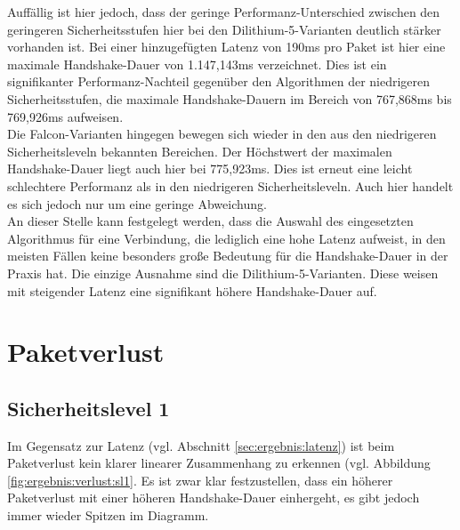 		Auffällig ist hier jedoch, dass der geringe Performanz-Unterschied zwischen den geringeren 						Sicherheitsstufen hier bei den 				Dilithium-5-Varianten deutlich stärker vorhanden ist. Bei einer 					hinzugefügten Latenz von 190ms pro Paket ist hier eine maximale 				Handshake-Dauer von 1.147,143ms 					verzeichnet. Dies ist ein signifikanter Performanz-Nachteil gegenüber den Algorithmen der niedrigeren 				Sicherheitsstufen, die maximale Handshake-Dauern im Bereich von 767,868ms bis 769,926ms 				aufweisen.\\
		
		Die Falcon-Varianten hingegen bewegen sich wieder in den aus den niedrigeren Sicherheitsleveln bekannten Bereichen. Der Höchstwert der maximalen Handshake-Dauer liegt auch hier bei 775,923ms. Dies ist erneut eine leicht schlechtere Performanz als in den niedrigeren Sicherheitsleveln. Auch hier handelt es sich jedoch nur um eine geringe Abweichung.\\
		
		An dieser Stelle kann festgelegt werden, dass die Auswahl des eingesetzten Algorithmus für eine Verbindung, die lediglich eine hohe Latenz aufweist, in den meisten Fällen keine besonders große Bedeutung für die Handshake-Dauer in der Praxis hat. Die einzige Ausnahme sind die Dilithium-5-Varianten. Diese weisen mit steigender Latenz eine signifikant höhere Handshake-Dauer auf.
		
	\section{Paketverlust}
	\label{sec:ergebnis:verlust}
	
		\subsection{Sicherheitslevel 1}
		\label{subsec:ergebnis:verlust:sl1}
		
		Im Gegensatz zur Latenz (vgl. Abschnitt \ref{sec:ergebnis:latenz}) ist beim Paketverlust kein klarer linearer Zusammenhang zu erkennen (vgl. 					Abbildung \ref{fig:ergebnis:verlust:sl1}. Es ist zwar klar festzustellen, dass ein höherer Paketverlust mit einer höheren Handshake-Dauer 						einhergeht, es gibt jedoch immer wieder Spitzen im Diagramm.\\
		
